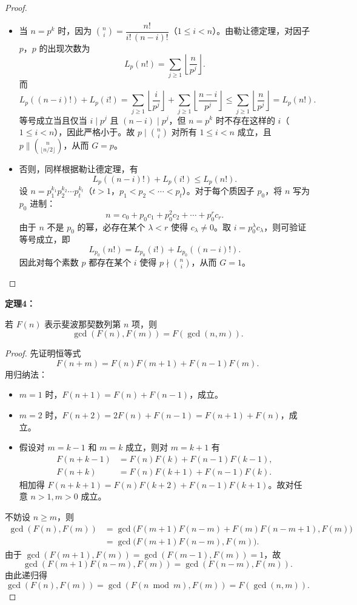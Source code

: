 \begin{proof}

\begin{itemize}
\item 当 $n = p^k$ 时，因为 $\binom{n}{i} = \dfrac{n!}{i!\,(n-i)!}$（$1 \le i < n$）。由勒让德定理，对因子 $p$，$p$ 的出现次数为
\[
L_p(n!) = \sum_{j \ge 1}\left\lfloor\frac{n}{p^j}\right\rfloor.
\]
而
\[
L_p((n-i)!) + L_p(i!) = \sum_{j \ge 1}\left\lfloor\frac{i}{p^j}\right\rfloor + \sum_{j \ge 1}\left\lfloor\frac{n-i}{p^j}\right\rfloor
\le \sum_{j \ge 1}\left\lfloor\frac{n}{p^j}\right\rfloor = L_p(n!).
\]
等号成立当且仅当 $i \mid p^j$ 且 $(n-i) \mid p^j$，但 $n = p^k$ 时不存在这样的 $i$（$1 \le i < n$），因此严格小于。故 $p \mid \binom{n}{i}$ 对所有 $1 \le i < n$ 成立，且 $p \parallel \binom{n}{\lfloor n/2\rfloor}$，从而 $G = p$。

\item 否则，同样根据勒让德定理，有
\[
L_p((n-i)!) + L_p(i!) \le L_p(n!).
\]
设 $n = p_1^{k_1}p_2^{k_2}\cdots p_t^{k_t}$（$t>1$，$p_1<p_2<\cdots<p_t$）。对于每个质因子 $p_0$，将 $n$ 写为 $p_0$ 进制：
\[
n = c_0 + p_0c_1 + p_0^2c_2 + \cdots + p_0^r c_r.
\]
由于 $n$ 不是 $p_0$ 的幂，必存在某个 $\lambda < r$ 使得 $c_\lambda \neq 0$。取 $i = p_0^\lambda c_\lambda$，则可验证等号成立，即
\[
L_{p_0}(n!) = L_{p_0}(i!) + L_{p_0}((n-i)!).
\]
因此对每个素数 $p$ 都存在某个 $i$ 使得 $p \nmid \binom{n}{i}$，从而 $G = 1$。
\end{itemize}

\end{proof}

\textbf{定理4：}

若 $F(n)$ 表示斐波那契数列第 $n$ 项，则
\[
\gcd(F(n), F(m)) = F(\gcd(n, m)).
\]

\begin{proof}

先证明恒等式
\[
F(n+m) = F(n)F(m+1) + F(n-1)F(m).
\]
用归纳法：
\begin{itemize}
\item $m=1$ 时，$F(n+1)=F(n)+F(n-1)$，成立。
\item $m=2$ 时，$F(n+2)=2F(n)+F(n-1)=F(n+1)+F(n)$，成立。
\item 假设对 $m=k-1$ 和 $m=k$ 成立，则对 $m=k+1$ 有
\[
\begin{aligned}
F(n+k-1) &= F(n)F(k) + F(n-1)F(k-1),\\
F(n+k) &= F(n)F(k+1) + F(n-1)F(k).
\end{aligned}
\]
相加得 $F(n+k+1)=F(n)F(k+2)+F(n-1)F(k+1)$。故对任意 $n>1,m>0$ 成立。
\end{itemize}
不妨设 $n \ge m$，则
\[
\begin{aligned}
\gcd(F(n),F(m)) &= \gcd\bigl(F(m+1)F(n-m)+F(m)F(n-m+1),F(m)\bigr)\\
&= \gcd\bigl(F(m+1)F(n-m),F(m)\bigr).
\end{aligned}
\]
由于 $\gcd(F(m+1),F(m)) = \gcd(F(m-1),F(m)) = 1$，故
\[
\gcd(F(m+1)F(n-m),F(m)) = \gcd(F(n-m),F(m)).
\]
由此递归得
\[
\gcd(F(n),F(m)) = \gcd(F(n \bmod m),F(m)) = F(\gcd(n,m)).
\]

\end{proof}

